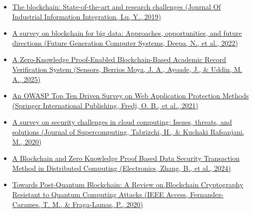 \documentclass[conference]{IEEEtran}
\begin{document}
\begin{itemize}

    \item 
    \href{https://doi.org/10.1016/j.jii.2019.04.002}{The blockchain: State-of-the-art and research challenges (Journal Of Industrial Information Integration, Lu, Y., 2019)}

    \item 
    \href{https://doi.org/10.1016/j.future.2022.01.017}{A survey on blockchain for big data: Approaches, opportunities, and future directions (Future Generation Computer Systems, Deepa, N., et al., 2022)}

    \item \begin{otherlanguage}{english}
    \href{https://doi.org/10.3390/s25113450}{A Zero-Knowledge Proof-Enabled Blockchain-Based Academic Record Verification System (Sensors, Berrios Moya, J. A., Ayoade, J., \& Uddin, M. A., 2025)}
    \end{otherlanguage}
    \item 
    \href{https://doi.org/10.1007/978-3-030-68887-5_14}{An OWASP Top Ten Driven Survey on Web Application Protection Methods (Springer International Publishing, Fredj, O. B., et al., 2021)}

    \item 
    \href{https://doi.org/10.1007/s11227-020-03213-1}{A survey on security challenges in cloud computing: Issues, threats, and solutions (Journal of Supercomputing, Tabrizchi, H., \& Kuchaki Rafsanjani, M., 2020)}

    \item 
    \href{https://doi.org/10.3390/electronics13214260}{A Blockchain and Zero Knowledge Proof Based Data Security Transaction Method in Distributed Computing (Electronics, Zhang, B., et al., 2024)}
    \item 
    \href{https://doi.org/10.1109/access.2020.2968985}{Towards Post-Quantum Blockchain: A Review on Blockchain Cryptography Resistant to Quantum Computing Attacks (IEEE Access, Fernandez-Carames, T. M., \& Fraga-Lamas, P., 2020)}

\end{itemize}
\end{document}
